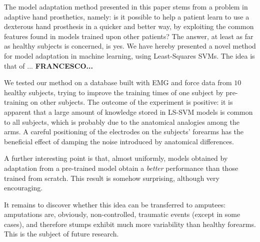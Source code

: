 The model adaptation method presented in this paper stems from a
problem in adaptive hand prosthetics, namely: is it possible to help a
patient learn to use a dexterous hand prosthesis in a quicker and
better way, by exploiting the common features found in models trained
upon other patients? The answer, at least as far as healthy subjects
is concerned, is yes. We have hereby presented a novel method for
model adaptation in machine learning, using Least-Squares SVMs. The
idea is that of ... \textbf{FRANCESCO...}

We tested our method on a database built with EMG and force data from
$10$ healthy subjects, trying to improve the training times of one
subject by pre-training on other subjects. The outcome of the
experiment is positive: it is apparent that a large amount of
knowledge stored in LS-SVM models is common to all subjects, which is
probably due to the anatomical analogies among the arms. A careful
positioning of the electrodes on the subjects' forearms has the
beneficial effect of damping the noise introduced by anatomical
differences.

A further interesting point is that, almost uniformly, models obtained
by adaptation from a pre-trained model obtain a \emph{better}
performance than those trained from scratch. This result is somehow
surprising, although very encouraging.

It remains to discover whether this idea can be transferred to
amputees: amputations are, obviously, non-controlled, traumatic events
(except in some cases), and therefore stumps exhibit much more
variability than healthy forearms. This is the subject of future
research.
